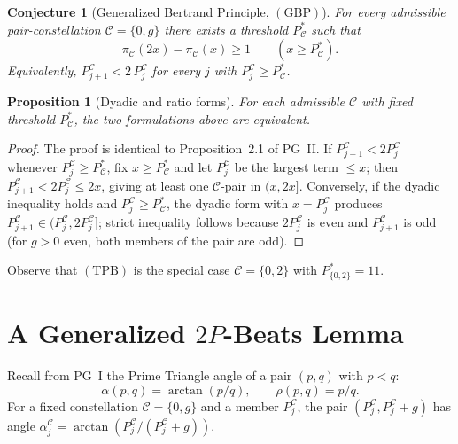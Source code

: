 \documentclass[11pt]{article}
\newtheorem{proposition}[theorem]{Proposition}
\newtheorem{conjecture}[theorem]{Conjecture}
\begin{document}
\begin{conjecture}[Generalized Bertrand Principle, $(\mathrm{GBP})$]
\label{conj:GBP}
For every admissible pair-constellation $\mathcal{C}=\{0,g\}$ there
exists a threshold $P^{*}_\mathcal{C}$ such that
\[
\pi_\mathcal{C}(2x)-\pi_\mathcal{C}(x)\ge 1\qquad(x\ge P^{*}_\mathcal{C}).
\]
Equivalently, $P^{\mathcal{C}}_{j+1}<2\,P^{\mathcal{C}}_j$ for every
$j$ with $P^{\mathcal{C}}_j\ge P^{*}_\mathcal{C}$.
\end{conjecture}

\begin{proposition}[Dyadic and ratio forms]\label{prop:dyadic}
For each admissible $\mathcal{C}$ with fixed threshold
$P^{*}_\mathcal{C}$, the two formulations above are equivalent.
\end{proposition}

\begin{proof}
The proof is identical to Proposition~2.1 of PG~II. If
$P^{\mathcal{C}}_{j+1}<2P^{\mathcal{C}}_j$ whenever
$P^{\mathcal{C}}_j\ge P^{*}_\mathcal{C}$, fix $x\ge P^{*}_\mathcal{C}$
and let $P^{\mathcal{C}}_j$ be the largest term
$\le x$; then $P^{\mathcal{C}}_{j+1}<2P^{\mathcal{C}}_j\le 2x$, giving
at least one $\mathcal{C}$-pair in $(x,2x]$. Conversely, if the
dyadic inequality holds and $P^{\mathcal{C}}_j\ge P^{*}_\mathcal{C}$,
the dyadic form with $x=P^{\mathcal{C}}_j$ produces
$P^{\mathcal{C}}_{j+1}\in(P^{\mathcal{C}}_j,2P^{\mathcal{C}}_j]$; strict
inequality follows because $2P^{\mathcal{C}}_j$ is even and
$P^{\mathcal{C}}_{j+1}$ is odd (for $g>0$ even, both members of the
pair are odd).
\end{proof}

Observe that $(\mathrm{TPB})$ is the special case
$\mathcal{C}=\{0,2\}$ with $P^{*}_{\{0,2\}}=11$.

\section{A Generalized $2P$-Beats Lemma}\label{sec:2Pgen}

Recall from PG~I the Prime Triangle angle of a pair $(p,q)$ with
$p<q$:
\[
\alpha(p,q)=\arctan(p/q),\qquad \rho(p,q)=p/q.
\]
For a fixed constellation $\mathcal{C}=\{0,g\}$ and a member
$P^{\mathcal{C}}_j$, the pair $(P^{\mathcal{C}}_j,P^{\mathcal{C}}_j+g)$
has angle $\alpha^{\mathcal{C}}_j=\arctan(P^{\mathcal{C}}_j/(P^{\mathcal{C}}_j+g))$.
\end{document}

